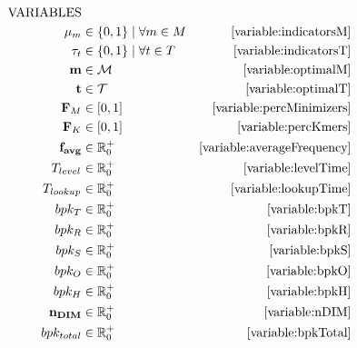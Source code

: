 \documentclass[a4paper,titlepage,onecolumn,oneside,12pt,nenglish,titlepage=firstiscover]{scrbook}
\theoremstyle{plain} %
\theoremstyle{definition} %
\theoremstyle{remark} %
\theoremstyle{plain}
\newcommand{\RR}{\mathbb{R}} %
\newcommand{\minimizerLength}{m}
\newcommand{\threshold}{t}
\newcommand{\timeForOperationOnStructure}[2]{T_{#1_{#2}}} %
\newcommand{\varAverageFrequency}{\textbf{f}_{\textbf{avg}}}
\newcommand{\possibleMinimizerLengths}{\mathcal{M}}
\newcommand{\possibleThresholds}{\mathcal{T}}
\newcommand{\indicatorm}{\mu}
\newcommand{\indicatort}{\tau}
\newcommand{\varMinimizerLength}{\textbf{\minimizerLength}}
\newcommand{\varThreshold}{\textbf{\threshold}}
\begin{document}
\begin{align*}
	\text{VARIABLES}\\
	\indicatorm_\minimizerLength &\in \{0,1\} \mid \forall m \in M &\Cref{variable:indicatorsM}\\
	\indicatort_\threshold &\in \{0,1\} \mid \forall t \in T &\Cref{variable:indicatorsT}\\
	\varMinimizerLength &\in \possibleMinimizerLengths &\Cref{variable:optimalM}\\
	\varThreshold &\in \possibleThresholds &\Cref{variable:optimalT}\\
	\varCDF{M} &\in [0,1] &\Cref{variable:percMinimizers}\\
	\varCDF{K} &\in [0,1] &\Cref{variable:percKmers}\\
	\varAverageFrequency &\in \RR_0^+ &\Cref{variable:averageFrequency}\\
	\timeForOperationOnStructure{level}{} &\in \RR^+_0 &\Cref{variable:levelTime}\\
	\timeForOperationOnStructure{lookup}{} &\in \RR_0^+ &\Cref{variable:lookupTime}\\
	bpk_T &\in \RR_0^+ &\Cref{variable:bpkT}\\
	bpk_R &\in \RR_0^+ &\Cref{variable:bpkR}\\
	bpk_S &\in \RR_0^+ &\Cref{variable:bpkS}\\
	bpk_O &\in \RR_0^+ &\Cref{variable:bpkO}\\
	bpk_H &\in \RR_0^+ &\Cref{variable:bpkH}\\
	\varNumberOfDistinctMinimizers &\in \RR^+_0 &\Cref{variable:nDIM}\\
	bpk_{total} &\in \RR_0^+ &\Cref{variable:bpkTotal}
\end{align*} 
\end{document}
